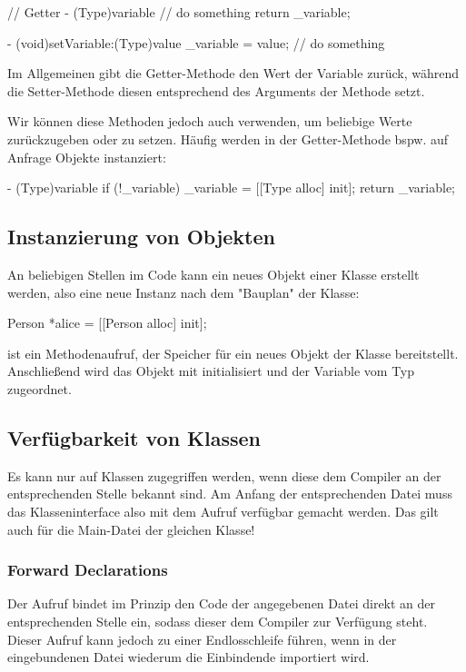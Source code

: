 \documentclass[parskip=half, final]{scrreprt}
\begin{document}
\begin{objclst}
// Getter
- (Type)variable {
    // do something
    return _variable;
}
\end{objclst}

\begin{objclst}
- (void)setVariable:(Type)value {
    _variable = value; 
    // do something
}
\end{objclst}

Im Allgemeinen gibt die Getter-Methode den Wert der Variable zurück, während die Setter-Methode diesen entsprechend des Arguments der Methode setzt.

Wir können diese Methoden jedoch auch verwenden, um beliebige Werte zurückzugeben oder zu setzen. Häufig werden in der Getter-Methode bspw. auf Anfrage Objekte instanziert:

\begin{objclst}
- (Type)variable {
    if (!_variable) _variable = [[Type alloc] init];
    return _variable;
}
\end{objclst}

\subsection{Instanzierung von Objekten}

An beliebigen Stellen im Code kann ein neues Objekt einer Klasse erstellt werden, also eine neue Instanz nach dem "Bauplan"{} der Klasse:
\begin{objclst}
Person *alice = [[Person alloc] init];
\end{objclst}
 ist ein Methodenaufruf, der Speicher für ein neues Objekt der Klasse  bereitstellt. Anschließend wird das Objekt mit  initialisiert und der Variable  vom Typ  zugeordnet.

\subsection{Verfügbarkeit von Klassen}
Es kann nur auf Klassen zugegriffen werden, wenn diese dem Compiler an der entsprechenden Stelle bekannt sind. Am Anfang der entsprechenden Datei muss das Klasseninterface also mit dem Aufruf  verfügbar gemacht werden. Das gilt auch für die Main-Datei der gleichen Klasse!

\subsubsection{Forward Declarations}
Der Aufruf  bindet im Prinzip den Code der angegebenen Datei direkt an der entsprechenden Stelle ein, sodass dieser dem Compiler zur Verfügung steht. Dieser Aufruf kann jedoch zu einer Endlosschleife führen, wenn in der eingebundenen Datei wiederum die Einbindende importiert wird.
\end{document}
